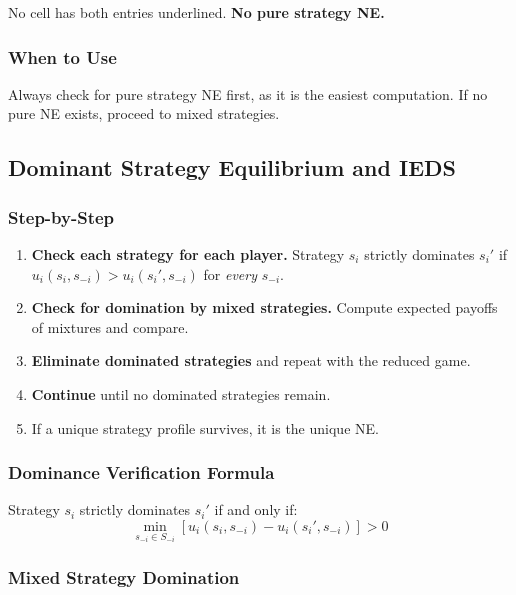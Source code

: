 \documentclass[hidelinks]{article}
\begin{document}
No cell has both entries underlined. \textbf{No pure strategy NE.}

\subsubsection{When to Use}

Always check for pure strategy NE first, as it is the easiest computation. If no pure NE exists, proceed to mixed strategies.

\subsection{Dominant Strategy Equilibrium and IEDS}

\subsubsection{Step-by-Step}

\begin{enumerate}
    \item \textbf{Check each strategy for each player.} Strategy $s_i$ strictly dominates $s_i'$ if $u_i(s_i, s_{-i}) > u_i(s_i', s_{-i})$ for \textit{every} $s_{-i}$.
    \item \textbf{Check for domination by mixed strategies.} Compute expected payoffs of mixtures and compare.
    \item \textbf{Eliminate dominated strategies} and repeat with the reduced game.
    \item \textbf{Continue} until no dominated strategies remain.
    \item If a unique strategy profile survives, it is the unique NE.
\end{enumerate}

\subsubsection{Dominance Verification Formula}

Strategy $s_i$ strictly dominates $s_i'$ if and only if:
\[
\min_{s_{-i} \in S_{-i}} \left[u_i(s_i, s_{-i}) - u_i(s_i', s_{-i})\right] > 0
\]

\subsubsection{Mixed Strategy Domination}
\end{document}
